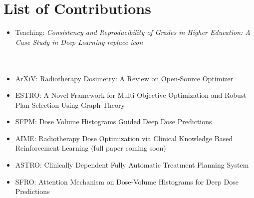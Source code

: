 \chapter*{List of Contributions}
\Large

\begin{itemize}
	\item Teaching: \textit{Consistency and Reproducibility of Grades in Higher Education: A Case Study in Deep Learning  	replace icon}\\\\\\
	\item ArXiV: Radiotherapy Dosimetry: A Review on Open-Source Optimizer
	\item ESTRO: A Novel Framework for Multi-Objective Optimization and Robust Plan Selection Using Graph Theory
	\item SFPM: Dose Volume Histograms Guided Deep Dose Predictions
	\item AIME: Radiotherapy Dose Optimization via Clinical Knowledge Based Reinforcement Learning (full paper coming soon)
	\item ASTRO: Clinically Dependent Fully Automatic Treatment Planning System
	\item SFRO: Attention Mechanism on Dose-Volume Histograms for Deep Dose Predictions
\end{itemize}

\normalsize